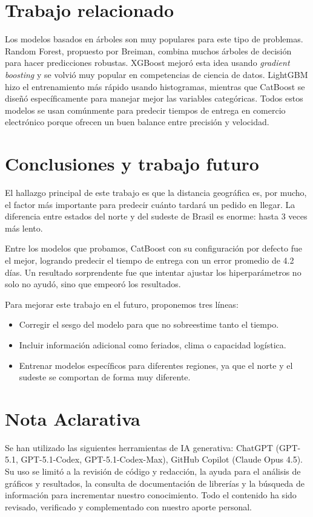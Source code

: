 \documentclass[journal]{IEEEtran}
\begin{document}
\section{Trabajo relacionado}

Los modelos basados en árboles son muy populares para este tipo de problemas. Random Forest, propuesto por Breiman\cite{breiman2001random}, combina muchos árboles de decisión para hacer predicciones robustas. XGBoost\cite{chen2016xgboost} mejoró esta idea usando \textit{gradient boosting} y se volvió muy popular en competencias de ciencia de datos. LightGBM\cite{ke2017lightgbm} hizo el entrenamiento más rápido usando histogramas, mientras que CatBoost\cite{prokhorenkova2018catboost} se diseñó específicamente para manejar mejor las variables categóricas. Todos estos modelos se usan comúnmente para predecir tiempos de entrega en comercio electrónico porque ofrecen un buen balance entre precisión y velocidad.

\section{Conclusiones y trabajo futuro}

El hallazgo principal de este trabajo es que la distancia geográfica es, por mucho, el factor más importante para predecir cuánto tardará un pedido en llegar. La diferencia entre estados del norte y del sudeste de Brasil es enorme: hasta 3 veces más lento.

Entre los modelos que probamos, CatBoost con su configuración por defecto fue el mejor, logrando predecir el tiempo de entrega con un error promedio de 4.2 días. Un resultado sorprendente fue que intentar ajustar los hiperparámetros no solo no ayudó, sino que empeoró los resultados.

Para mejorar este trabajo en el futuro, proponemos tres líneas:
\begin{itemize}
	\item Corregir el sesgo del modelo para que no sobreestime tanto el tiempo.
	\item Incluir información adicional como feriados, clima o capacidad logística.
	\item Entrenar modelos específicos para diferentes regiones, ya que el norte y el sudeste se comportan de forma muy diferente.
\end{itemize}

\section*{Nota Aclarativa}

Se han utilizado las siguientes herramientas de IA generativa: ChatGPT (GPT-5.1, GPT-5.1-Codex, GPT-5.1-Codex-Max), GitHub Copilot (Claude Opus 4.5). Su uso se limitó a la revisión de código y redacción, la ayuda para el análisis de gráficos y resultados, la consulta de documentación de librerías y la búsqueda de información para incrementar nuestro conocimiento. Todo el contenido ha sido revisado, verificado y complementado con nuestro aporte personal.



\end{document}
